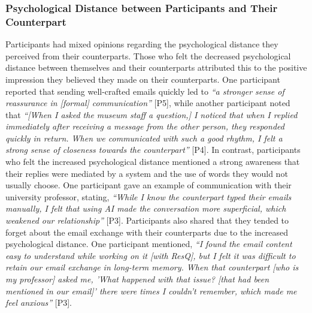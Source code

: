 \subsubsection{Psychological Distance between Participants and Their Counterpart}
\label{sec:result2_psychological_distance}
Participants had mixed opinions regarding the psychological distance they perceived from their counterparts.
Those who felt the decreased psychological distance between themselves and their counterparts attributed this to the positive impression they believed they made on their counterparts. 
One participant reported that sending well-crafted emails quickly led to \textit{``a stronger sense of reassurance in [formal] communication''} [P5], while another participant noted that \textit{``[When I asked the museum staff a question,] I noticed that when I replied immediately after receiving a message from the other person, they responded quickly in return. When we communicated with such a good rhythm, I felt a strong sense of closeness towards the counterpart''} [P4].
In contrast, participants who felt the increased psychological distance mentioned a strong awareness that their replies were mediated by a system and the use of words they would not usually choose. 
One participant gave an example of communication with their university professor, stating, \textit{``While I know the counterpart typed their emails manually, I felt that using AI made the conversation more superficial, which weakened our relationship''} [P3]. 
Participants also shared that they tended to forget about the email exchange with their counterparts due to the increased psychological distance.
One participant mentioned, \textit{``I found the email content easy to understand while working on it [with ResQ], but I felt it was difficult to retain our email exchange in long-term memory. When that counterpart [who is my professor] asked me, 'What happened with that issue? [that had been mentioned in our email]' there were times I couldn’t remember, which made me feel anxious''} [P3].


